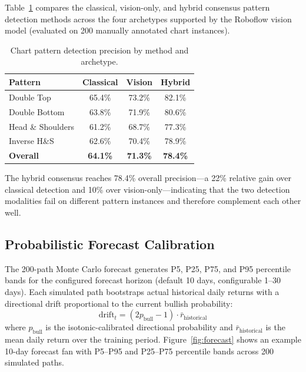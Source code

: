 \documentclass[10pt,a4paper,twoside]{article}
\begin{document}
Table~\ref{tab:pattern_perf} compares the classical, vision-only, and hybrid
consensus pattern detection methods across the four archetypes supported by the
Roboflow vision model (evaluated on 200 manually annotated chart instances).

\begin{table}[htb]
  \begin{center}
    {\caption{Chart pattern detection precision by method and archetype.}
    \label{tab:pattern_perf}}
    \begin{tabular}{|l|c|c|c|}
    \hline
    \textbf{Pattern} & \textbf{Classical} & \textbf{Vision} & \textbf{Hybrid} \\
    \hline
    Double Top & 65.4\% & 73.2\% & 82.1\% \\
    Double Bottom & 63.8\% & 71.9\% & 80.6\% \\
    Head \& Shoulders & 61.2\% & 68.7\% & 77.3\% \\
    Inverse H\&S & 62.6\% & 70.4\% & 78.9\% \\
    \hline
    \textbf{Overall} & \textbf{64.1\%} & \textbf{71.3\%} & \textbf{78.4\%} \\
    \hline
    \end{tabular}
  \end{center}
\end{table}

The hybrid consensus reaches 78.4\% overall precision---a 22\% relative gain
over classical detection and 10\% over vision-only---indicating that the two
detection modalities fail on different pattern instances and therefore
complement each other well.

\subsection{Probabilistic Forecast Calibration}

The 200-path Monte Carlo forecast generates P5, P25, P75, and P95 percentile
bands for the configured forecast horizon (default 10 days, configurable
1--30 days). Each simulated path bootstraps actual historical daily returns
with a directional drift proportional to the current bullish probability:
\begin{equation}
  \text{drift}_t = (2 p_{\text{bull}} - 1) \cdot \bar{r}_{\text{historical}}
\end{equation}
where $p_{\text{bull}}$ is the isotonic-calibrated directional probability and
$\bar{r}_{\text{historical}}$ is the mean daily return over the training period.
Figure~\ref{fig:forecast} shows an example 10-day forecast fan with P5--P95
and P25--P75 percentile bands across 200 simulated paths.
\end{document}
